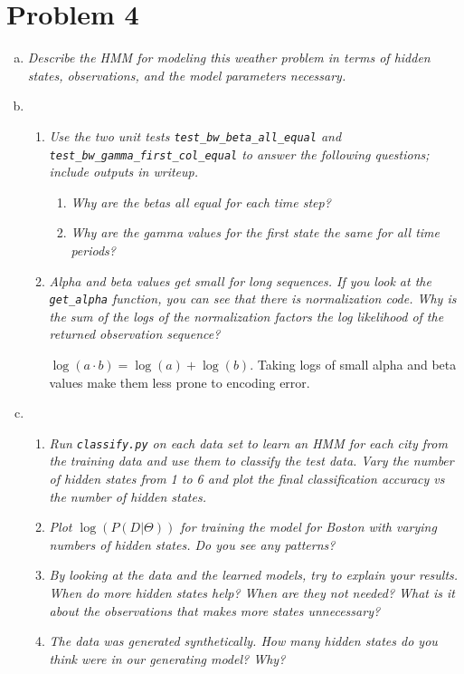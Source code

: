 \documentclass{article}
\begin{document}
\section*{Problem 4}
\begin{enumerate}[(a)]
\item \emph{Describe the HMM for modeling this weather problem in terms of hidden
  states, observations, and the model parameters necessary.}

\item
  \begin{enumerate}
  \setcounter{enumiii}2
  \item \emph{Use the two unit tests \emph{\texttt{test\_bw\_beta\_all\_equal}}
    and
    \emph{\texttt{test\_bw\_gamma\_first\_col\_equal}} to answer the following questions;
    include outputs in writeup.}

    \begin{enumerate}[(1)]
    \item \emph{Why are the betas all equal for each time step?}
    \item \emph{Why are the gamma values for the first state the same for all time periods?}
    \end{enumerate}

  \item \emph{Alpha and beta values get small for long sequences. If you look at the
    \emph{\texttt{get\_alpha}} function, you can see that there is normalization code.
    Why is the sum of the logs of the normalization factors the log likelihood of
    the returned observation sequence?}

    $\log(a\cdot b)=\log(a)+\log(b)$. Taking logs of small alpha and beta values
    make them less prone to encoding error.

  \end{enumerate}

\item
  \begin{enumerate}
  \item \emph{Run \texttt{\emph{classify.py}} on each data set to learn an HMM
    for each city from the training data and use them to classify the test data.
    Vary the number of hidden states from 1 to 6 and plot the final classification
    accuracy vs the number of hidden states.}

  \item \emph{Plot $\log(P(D|\Theta))$ for training the model for Boston with
    varying numbers of hidden states. Do you see any patterns?}

  \item \emph{By looking at the data and the learned models, try to explain your
    results. When do more hidden states help? When are they not needed? What is
    it about the observations that makes more states unnecessary?}

  \item \emph{The data was generated synthetically. How many hidden states do you
    think were in our generating model? Why?}

  \end{enumerate}
\end{enumerate}
\end{document}
